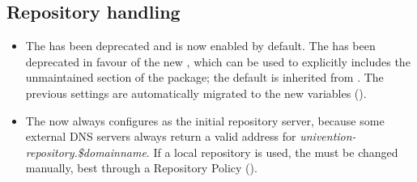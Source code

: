 \subsection{Repository handling}
\begin{itemize}
\item The  has been deprecated
  and is now enabled by default. The
   has been deprecated in
  favour of the new
  , which can be
  used to explicitly includes the unmaintained section of the package;
  the default is inherited from
  . The previous settings are automatically migrated to the new variables ().
\item The  now always configures
   as the initial
  repository server, because some external DNS servers always return a
  valid address for \emph{univention-repository.\$domainname}. If a
  local repository is used, the 
  must be changed manually, best through a Repository Policy
  ().


\end{itemize}
